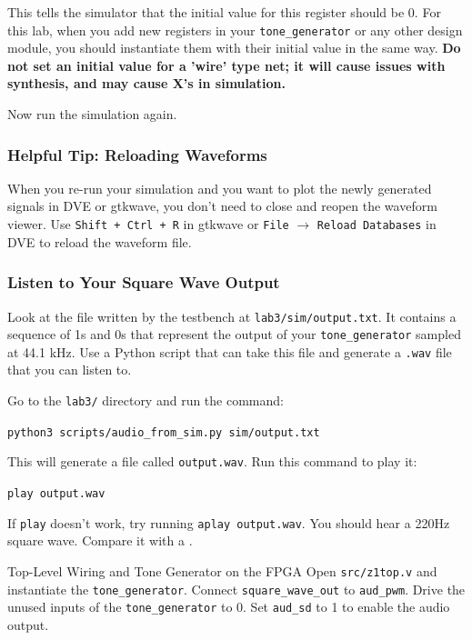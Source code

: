 \documentclass[11pt]{article}
\makeatletter
\renewcommand{\section}
{\@startsection {section}{1}{0pt}
 {-2ex}
 {1ex}
 {\bfseries\Large}}
\makeatother
\begin{document}
This tells the simulator that the initial value for this register should be 0.
For this lab, when you add new registers in your \verb|tone_generator| or any other design module, you should instantiate them with their initial value in the same way.
\textbf{Do not set an initial value for a 'wire' type net; it will cause issues with synthesis, and may cause X's in simulation.}

Now run the simulation again.
\subsubsection{Helpful Tip: Reloading Waveforms}
When you re-run your simulation and you want to plot the newly generated signals in DVE or gtkwave, you don't need to close and reopen the waveform viewer.
Use \verb|Shift + Ctrl + R| in gtkwave or \verb|File| $\rightarrow$ \verb|Reload Databases| in DVE to reload the waveform file.

\subsubsection{Listen to Your Square Wave Output}
Look at the file written by the testbench at \verb|lab3/sim/output.txt|.
It contains a sequence of 1s and 0s that represent the output of your \verb|tone_generator| sampled at 44.1 kHz.
Use a Python script that can take this file and generate a \verb|.wav| file that you can listen to.

Go to the \verb|lab3/| directory and run the command:

\verb|python3 scripts/audio_from_sim.py sim/output.txt|

This will generate a file called \verb|output.wav|. Run this command to play it:

\verb|play output.wav|

If \verb|play| doesn't work, try running \verb|aplay output.wav|.
You should hear a 220Hz square wave. Compare it with a \href{https://www.szynalski.com/tone-generator/}{\color{blue}{reference tone generator}}.

\section{Top-Level Wiring and Tone Generator on the FPGA}
Open \verb|src/z1top.v| and instantiate the \verb|tone_generator|.
Connect \verb|square_wave_out| to \verb|aud_pwm|.
Drive the unused inputs of the \verb|tone_generator| to 0.
Set \verb|aud_sd| to 1 to enable the audio output.
\end{document}
